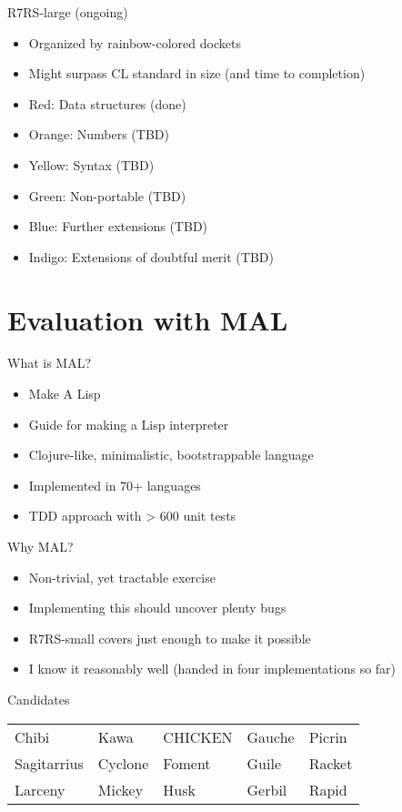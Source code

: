\documentclass[presentation]{beamer}
\begin{document}
\begin{frame}[label=sec-2-6]{R7RS-large (ongoing)}
\begin{itemize}
\item Organized by rainbow-colored dockets
\item Might surpass CL standard in size (and time to completion)
\item Red: Data structures (done)
\item Orange: Numbers (TBD)
\item Yellow: Syntax (TBD)
\item Green: Non-portable (TBD)
\item Blue: Further extensions (TBD)
\item Indigo: Extensions of doubtful merit (TBD)
\end{itemize}
\end{frame}

\section{Evaluation with MAL}
\label{sec-3}

\begin{frame}[label=sec-3-1]{What is MAL?}
\begin{itemize}
\item Make A Lisp
\item Guide for making a Lisp interpreter
\item Clojure-like, minimalistic, bootstrappable language
\item Implemented in 70+ languages
\item TDD approach with > 600 unit tests
\end{itemize}
\end{frame}

\begin{frame}[label=sec-3-2]{Why MAL?}
\begin{itemize}
\item Non-trivial, yet tractable exercise
\item Implementing this should uncover plenty bugs
\item R7RS-small covers just enough to make it possible
\item I know it reasonably well (handed in four implementations so far)
\end{itemize}
\end{frame}

\begin{frame}[label=sec-3-3]{Candidates}
\begin{center}
\begin{tabular}{lllll}
Chibi & Kawa & CHICKEN & Gauche & Picrin\\
Sagitarrius & Cyclone & Foment & Guile & Racket\\
Larceny & Mickey & Husk & Gerbil & Rapid\\
\end{tabular}
\end{center}
\end{frame}
\end{document}
